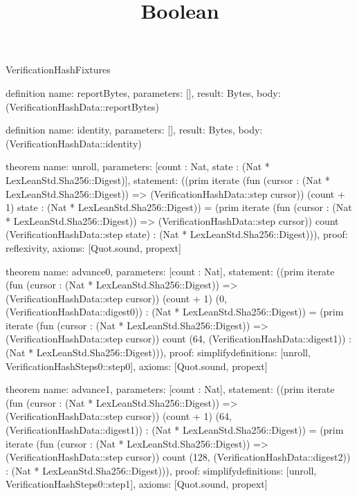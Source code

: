 \begin{lexlean}{VerificationHashFixtures}
\title{Boolean}
\begin{semanticmodule}

definition{
  name: reportBytes,
  parameters: [],
  result: Bytes,
  body: (VerificationHashData::reportBytes)
}

definition{
  name: identity,
  parameters: [],
  result: Bytes,
  body: (VerificationHashData::identity)
}

theorem{
  name: unroll,
  parameters: [count : Nat, state : (Nat * LexLeanStd.Sha256::Digest)],
  statement: ((prim iterate (fun (cursor : (Nat * LexLeanStd.Sha256::Digest)) => (VerificationHashData::step cursor)) (count + 1) state : (Nat * LexLeanStd.Sha256::Digest)) = (prim iterate (fun (cursor : (Nat * LexLeanStd.Sha256::Digest)) => (VerificationHashData::step cursor)) count (VerificationHashData::step state) : (Nat * LexLeanStd.Sha256::Digest))),
  proof: reflexivity{},
  axioms: [Quot.sound, propext]
}

theorem{
  name: advance0,
  parameters: [count : Nat],
  statement: ((prim iterate (fun (cursor : (Nat * LexLeanStd.Sha256::Digest)) => (VerificationHashData::step cursor)) (count + 1) (0, (VerificationHashData::digest0)) : (Nat * LexLeanStd.Sha256::Digest)) = (prim iterate (fun (cursor : (Nat * LexLeanStd.Sha256::Digest)) => (VerificationHashData::step cursor)) count (64, (VerificationHashData::digest1)) : (Nat * LexLeanStd.Sha256::Digest))),
  proof: simplify{definitions: [unroll, VerificationHashSteps0::step0]},
  axioms: [Quot.sound, propext]
}

theorem{
  name: advance1,
  parameters: [count : Nat],
  statement: ((prim iterate (fun (cursor : (Nat * LexLeanStd.Sha256::Digest)) => (VerificationHashData::step cursor)) (count + 1) (64, (VerificationHashData::digest1)) : (Nat * LexLeanStd.Sha256::Digest)) = (prim iterate (fun (cursor : (Nat * LexLeanStd.Sha256::Digest)) => (VerificationHashData::step cursor)) count (128, (VerificationHashData::digest2)) : (Nat * LexLeanStd.Sha256::Digest))),
  proof: simplify{definitions: [unroll, VerificationHashSteps0::step1]},
  axioms: [Quot.sound, propext]
}


\end{semanticmodule}
\end{lexlean}
